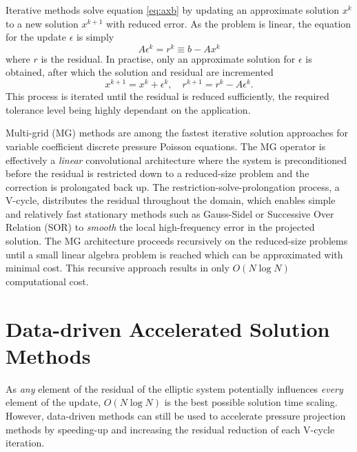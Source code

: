 \documentclass[review]{elsarticle}
\begin{document}
Iterative methods solve equation \ref{eq:axb} by updating an approximate solution $x^k$ to a new solution $x^{k+1}$ with reduced error. As the problem is linear, the equation for the update $\epsilon$ is simply
\begin{equation}\label{eq:aer} 
    A \epsilon^k = r^k \equiv b - Ax^k
\end{equation}
where $r$ is the residual. In practise, only an approximate solution for $\epsilon$ is obtained, after which the solution and residual are incremented
\begin{equation}
    x^{k+1} = x^k+\epsilon^k, \quad r^{k+1} = r^k-A\epsilon^k.
\end{equation}
This process is iterated until the residual is reduced sufficiently, the required tolerance level being highly dependant on the application.

Multi-grid (MG) methods are among the fastest iterative solution approaches for variable coefficient discrete pressure Poisson equations. The MG operator is effectively a \textit{linear} convolutional architecture where the system is preconditioned before the residual is restricted down to a reduced-size problem and the correction is prolongated back up. 
The restriction-solve-prolongation process, a V-cycle, distributes the residual throughout the domain, which enables simple and relatively fast stationary methods such as Gauss-Sidel or Successive Over Relation (SOR) to \textit{smooth} the local high-frequency error in the projected solution. The MG architecture proceeds recursively on the reduced-size problems until a small linear algebra problem is reached which can be approximated with minimal cost. This recursive approach results in only $O(N\log N)$ computational cost.

\section{Data-driven Accelerated Solution Methods}

As \textit{any} element of the residual of the elliptic system potentially influences \textit{every} element of the update, $O(N\log N)$ is the best possible solution time scaling. However, data-driven methods can still be used to accelerate pressure projection methods by speeding-up and increasing the residual reduction of each V-cycle iteration.
\end{document}
